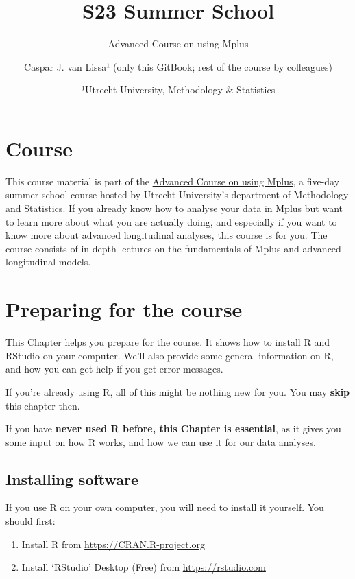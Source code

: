\documentclass[
]{book}
\title{S23 Summer School}
\subtitle{Advanced Course on using Mplus}
\author{Caspar J. van Lissa¹ (only this GitBook; rest of the course by colleagues)}
\date{¹Utrecht University, Methodology \& Statistics}
\providecommand{\tightlist}{%
  \setlength{\itemsep}{0pt}\setlength{\parskip}{0pt}}
\begin{document}
\maketitle

{
\setcounter{tocdepth}{1}
\tableofcontents
}
\hypertarget{course}{%
\chapter*{Course}\label{course}}

This course material is part of the \href{https://utrechtsummerschool.nl/courses/social-sciences/advanced-course-on-using-mplus}{Advanced Course on using Mplus},
a five-day summer school course hosted by Utrecht University's department of Methodology and Statistics. If you already know how to analyse your data in Mplus but want to learn more about what you are actually doing, and especially if you want to know more about advanced longitudinal analyses, this course is for you. The course consists of in-depth lectures on the fundamentals of Mplus and advanced longitudinal models.

\hypertarget{preparing-for-the-course}{%
\chapter{Preparing for the course}\label{preparing-for-the-course}}

This Chapter helps you prepare for the course. It shows how to install R and RStudio on your computer. We'll also provide some general information on R, and how you can get help if you get error messages.

If you're already using R, all of this might be nothing new for you. You may \textbf{skip} this chapter then.

If you have \textbf{never used R before, this Chapter is essential}, as it gives you some input on how R works, and how we can use it for our data analyses.

\hypertarget{installing-software}{%
\section{Installing software}\label{installing-software}}

If you use R on your own computer, you will need to install it yourself. You should first:

\begin{enumerate}
\def\labelenumi{\arabic{enumi}.}
\tightlist
\item
  Install R from \url{https://CRAN.R-project.org}
\item
  Install `RStudio' Desktop (Free) from \url{https://rstudio.com}
\end{enumerate}
\end{document}
